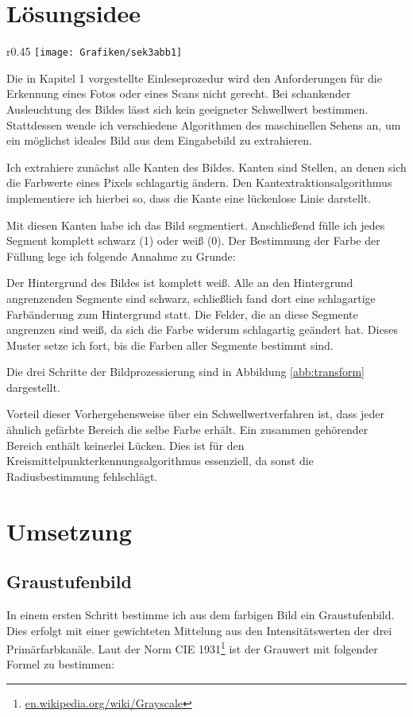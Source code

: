 \section{Lösungsidee}
\begin{wrapfigure}{r}{0.45\textwidth}
		\setlength\intextsep{0pt}
		\centering	
		\texttt{[image: Grafiken/sek3abb1]}
		\caption{Verbesserte Bilderkennung}
		\label{abb:transform}
	\end{wrapfigure}
Die in Kapitel 1 vorgestellte Einleseprozedur wird den Anforderungen für die Erkennung eines Fotos oder eines Scans nicht gerecht. Bei schankender Ausleuchtung des Bildes lässt sich kein geeigneter Schwellwert bestimmen. Stattdessen wende ich verschiedene Algorithmen des maschinellen Sehens an, um ein möglichst ideales Bild aus dem Eingabebild zu extrahieren.

Ich extrahiere zunächst alle Kanten des Bildes. Kanten sind Stellen, an denen sich die Farbwerte eines Pixels schlagartig ändern. Den Kantextraktionsalgorithmus implementiere ich hierbei so, dass die Kante eine lückenlose Linie darstellt.

Mit diesen Kanten habe ich das Bild segmentiert. Anschließend fülle ich jedes Segment komplett schwarz (1) oder weiß (0).
Der Bestimmung der Farbe der Füllung lege ich folgende Annahme zu Grunde:

Der Hintergrund des Bildes ist komplett weiß. Alle an den Hintergrund angrenzenden Segmente sind schwarz, schließlich fand dort eine schlagartige Farbänderung zum Hintergrund statt. Die Felder, die an diese Segmente angrenzen sind weiß, da sich die Farbe widerum schlagartig geändert hat. Dieses Muster setze ich fort, bis die Farben aller Segmente bestimmt sind.

Die drei Schritte der Bildprozessierung sind in Abbildung \ref{abb:transform} dargestellt.

Vorteil dieser Vorhergehensweise über ein Schwellwertverfahren ist, dass jeder ähnlich gefärbte Bereich die selbe Farbe erhält. Ein zusammen gehörender Bereich enthält keinerlei Lücken. Dies ist für den Kreismittelpunkterkennungsalgorithmus essenziell, da sonst die Radiusbestimmung fehlschlägt.
 
\section{Umsetzung}
\subsection{Graustufenbild}
In einem ersten Schritt bestimme ich aus dem farbigen Bild ein Graustufenbild. Dies erfolgt mit einer gewichteten Mittelung aus den Intensitätswerten der drei Primärfarbkanäle. Laut der Norm CIE 1931\footnote{\url{en.wikipedia.org/wiki/Grayscale}} ist der Grauwert mit folgender Formel zu bestimmen:

